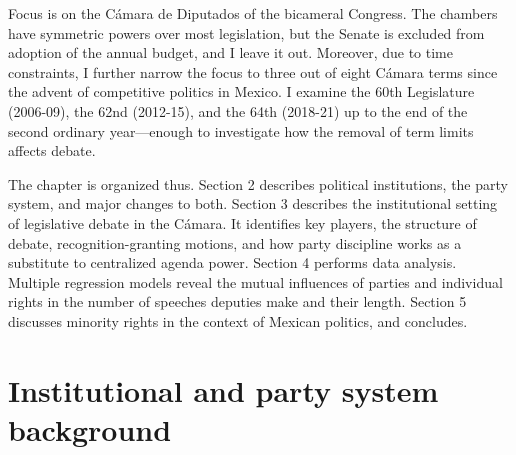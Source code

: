 \documentclass[letter,12pt]{article}
\begin{document}
Focus is on the Cámara de Diputados of the bicameral Congress. The chambers have symmetric powers over most legislation, but the Senate is excluded from adoption of the annual budget, and I leave it out. Moreover, due to time constraints, I further narrow the focus to three out of eight Cámara terms since the advent of competitive politics in Mexico. I examine the 60th Legislature (2006-09), the 62nd (2012-15), and the 64th (2018-21) up to the end of the second ordinary year---enough to investigate how the removal of term limits affects debate.

The chapter is organized thus. Section 2 describes political institutions, the party system, and major changes to both. Section 3 describes the institutional setting of legislative debate in the Cámara. It identifies key players, the structure of debate, recognition-granting motions, and how party discipline works as a substitute to centralized agenda power. Section 4 performs data analysis. Multiple regression models reveal the mutual influences of parties and individual rights in the number of speeches deputies make and their length. Section 5 discusses minority rights in the context of Mexican politics, and concludes. 

\section{Institutional and party system background} %





\end{document}

